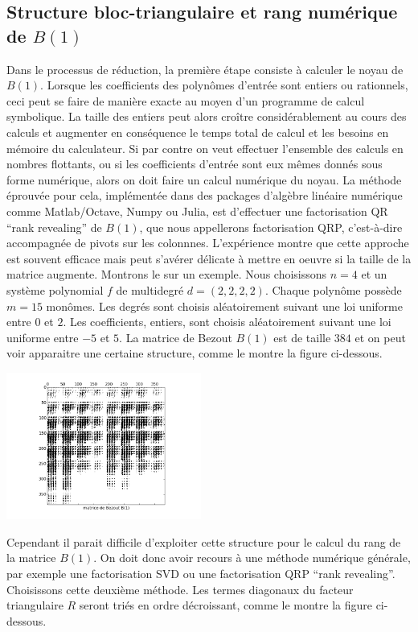 \documentclass{standalone}
\begin{document}
\subsection{Structure bloc-triangulaire et rang numérique de $B(1)$}
Dans le processus de réduction, la première étape consiste à calculer le noyau de $B(1)$. Lorsque les coefficients des polynômes d'entrée sont entiers ou rationnels, ceci peut se faire de manière exacte au moyen d'un programme de calcul symbolique. La taille des entiers peut alors croître considérablement au cours des calculs et augmenter en conséquence le temps total de calcul et les besoins en mémoire du calculateur. Si par contre on veut effectuer l'ensemble des calculs en nombres flottants, ou si les coefficients d'entrée sont eux mêmes donnés sous forme numérique, alors on doit faire un calcul numérique du noyau. La méthode éprouvée pour cela, implémentée dans des packages d'algèbre linéaire numérique comme Matlab/Octave, Numpy ou Julia, est d'effectuer une factorisation QR ``rank revealing'' de $B(1)$, que nous appellerons factorisation QRP, c'est-à-dire accompagnée de pivots sur les colonnnes. L'expérience montre que cette approche est souvent efficace mais peut s'avérer délicate à mettre en oeuvre si la taille de la matrice augmente. Montrons le sur un exemple. Nous choisissons $n = 4$ et un système polynomial $f$ de multidegré $d = (2, 2, 2, 2)$. Chaque polynôme possède $m = 15$ monômes. Les degrés sont choisis aléatoirement suivant une loi uniforme entre $0$ et $2$. Les coefficients, entiers, sont choisis aléatoirement suivant une loi uniforme entre $-5$ et $5$. La matrice de Bezout $B(1)$ est de taille $384$ et on peut voir apparaitre une certaine structure, comme le montre la figure ci-dessous.
  \begin{center}
    \includegraphics[width=0.48\textwidth]{../png/bez.png}
  \end{center}
Cependant il parait difficile d'exploiter cette structure pour le calcul du rang de la matrice $B(1)$. On doit donc avoir recours à une méthode numérique générale, par exemple une factorisation SVD ou une factorisation QRP ``rank revealing''. Choisissons cette deuxième méthode. Les termes diagonaux du facteur triangulaire $R$ seront triés en ordre décroissant, comme le montre la figure ci-dessous.
\end{document}
